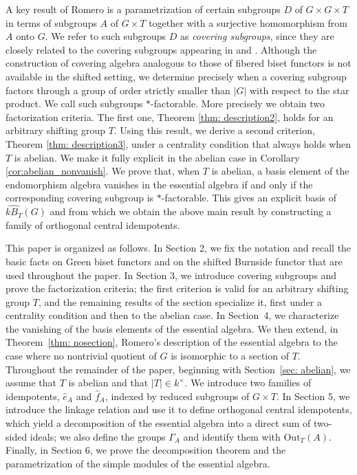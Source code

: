 \documentclass[12pt]{article}
\theoremstyle{change}
\newcommand{\Out}{\mathrm{Out}}
\newcommand{\1}{{\bf 1}}
\begin{document}
A key result of Romero is a parametrization of certain subgroups $D$ of $G\times G\times T$ in terms of subgroups $A$ of $G\times T$ together with a surjective homomorphism from $A$ onto $G$. We refer to such subgroups $D$ as \emph{covering subgroups}, since they are closely related to the covering subgroups appearing in \cite{BC} and \cite{CM}. Although the construction of covering algebra analogous to  those of fibered biset functors is not available in the shifted setting, we determine precisely when a covering subgroup factors through a group of order strictly smaller than $|G|$ with respect to the star product. We call such subgroups $\ast$-factorable. More precisely we obtain two factorization criteria. The first one, Theorem \ref{thm: description2}, holds for an arbitrary shifting group $T$. Using this result, we derive a second criterion, Theorem \ref{thm: description3}, under a centrality condition that always holds when $T$ is abelian. We make it fully explicit in the abelian case in Corollary \ref{cor:abelian_nonvanish}. We prove that, when $T$ is abelian, a basis element of the endomorphism algebra vanishes in the essential algebra if and only if the corresponding covering subgroup is $\ast$-factorable. This gives an explicit basis of $\widehat{kB_T}(G)$ and from which we obtain the above main result by constructing a family of orthogonal central idempotents.


This paper is organized as follows. In Section 2, we fix the notation and recall the basic facts on Green biset functors and on the shifted Burnside functor that are used throughout the paper. In Section 3, we introduce covering subgroups and prove the factorization criteria; the first criterion is valid for an arbitrary shifting group $T$, and the remaining results of the section specialize it, first under a centrality condition and then to the abelian case. In Section~4, we characterize the vanishing of the basis elements of the essential algebra. We then extend, in Theorem~\ref{thm: nosection}, Romero's description of the essential algebra to the case where no nontrivial quotient of \(G\) is isomorphic to a section of \(T\). Throughout the remainder of the paper, beginning with Section~\ref{sec: abelian}, we assume that \(T\) is abelian and that \(|T|\in k^{\times}\). We introduce two families of idempotents, \(\widehat{e}_A\) and \(\widehat{f}_A\), indexed by reduced subgroups of \(G\times T\). In Section 5, we introduce the linkage relation and use it to define orthogonal central idempotents, which yield a decomposition of the essential algebra into a direct sum of two-sided ideals; we also define the groups $\Gamma_A$ and identify them with $\Out_T(A)$. Finally, in Section 6, we prove the decomposition theorem and the parametrization of the simple modules of the essential algebra.
\end{document}

